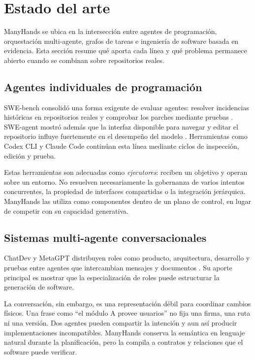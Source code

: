 \chapter{Estado del arte}
\label{cap:estado}

ManyHands se ubica en la intersección entre agentes de programación,
orquestación multi-agente, grafos de tareas e ingeniería de software basada en
evidencia. Esta sección resume qué aporta cada línea y qué problema permanece
abierto cuando se combinan sobre repositorios reales.

\section{Agentes individuales de programación}

SWE-bench consolidó una forma exigente de evaluar agentes: resolver incidencias
históricas en repositorios reales y comprobar los parches mediante pruebas
\cite{jimenez2024swebench}. SWE-agent mostró además que la interfaz disponible
para navegar y editar el repositorio influye fuertemente en el desempeño del
modelo \cite{yang2024sweagent}. Herramientas como Codex CLI y Claude Code
continúan esta línea mediante ciclos de inspección, edición y prueba.

Estas herramientas son adecuadas como \emph{ejecutores}: reciben un objetivo y
operan sobre un entorno. No resuelven necesariamente la gobernanza de varios
intentos concurrentes, la propiedad de interfaces compartidas o la integración
jerárquica. ManyHands las utiliza como componentes dentro de un plano de
control, en lugar de competir con su capacidad generativa.

\section{Sistemas multi-agente conversacionales}

ChatDev y MetaGPT distribuyen roles como producto, arquitectura, desarrollo y
pruebas entre agentes que intercambian mensajes y documentos
\cite{qian2024chatdev,hong2024metagpt}. Su aporte principal es mostrar que la
especialización de roles puede estructurar la generación de software.

La conversación, sin embargo, es una representación débil para coordinar
cambios físicos. Una frase como ``el módulo A provee usuarios'' no fija una
firma, una ruta ni una versión. Dos agentes pueden compartir la intención y aun
así producir implementaciones incompatibles. ManyHands conserva la semántica
en lenguaje natural durante la planificación, pero la compila a contratos y
relaciones que el software puede verificar.

